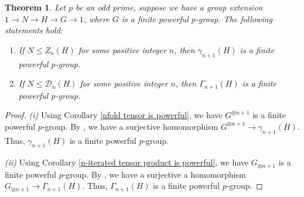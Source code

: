 \documentclass[12pt]{elsarticle}
\newtheorem{theorem}{Theorem}[section]
\newtheorem*{main corollary*}{Main Corollary}
\theoremstyle{definition}
\begin{document}
\begin{theorem} \label{gamma and derived is finite powerful}
     Let $p$ be an odd prime, suppose we have a group extension $1\to N\to H \to G\to 1$, where $G$ is a finite powerful $p$-group. The following statements hold:
    
    \begin{enumerate}
        \item [(i)] If $N\leqslant Z_n(H)$ for some positive integer $n$, then $\gamma_{n+1}(H)$ is a finite powerful $p$-group.
        \item[(ii)] If $N\leqslant \mathcal{D}_n(H)$ for some positive integer $n$, then $\Gamma_{n+1}(H)$ is a finite powerful $p$-group. 
    \end{enumerate}
\end{theorem}\label{powerful extension}
\begin{proof}
    \textit{(i)} Using Corollary \ref{nfold tensor is powerful}, we have $G^{\otimes n+1}$ is a finite powerful $p$-group. By \cite[Lemma 3.1]{Donadze21}, we have a surjective homomorphism $G^{\otimes n+1}\to \gamma_{n+1}(H)$. Thus, $\gamma_{n+1}(H)$ is a finite powerful $p$-group.\\
    \par \textit{(ii)} Using Corollary \ref{n-iterated tensor product is powerful}, we have $G_{\otimes n+1}$ is a finite powerful $p$-group. By \cite[Lemma 3.7]{Donadze21}, we have a surjective a homomorphism $G_{\otimes n+1}\to \Gamma_{n+1}(H)$. Thus, $\Gamma_{n+1}(H)$ is a finite powerful $p$-group.
\end{proof}
\end{document}
